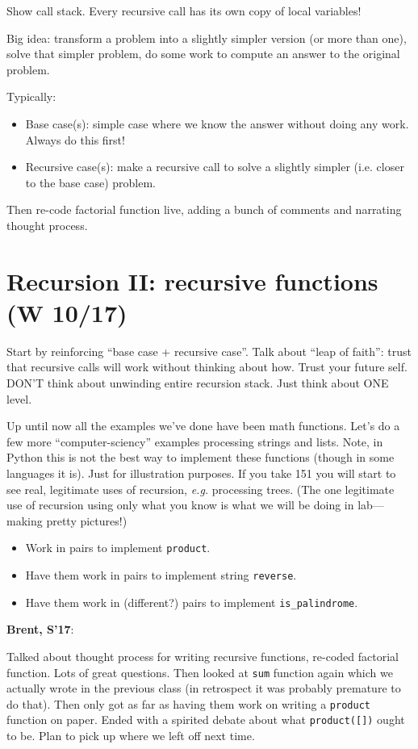 \documentclass{article}
\newcommand{\eg}{\emph{e.g.}\xspace}
\newenvironment{reflect}[1]
{
  \noindent
  \begin{lrbox}{\reflectbox}
    \begin{minipage}[t]{\textwidth}
      \textbf{#1}:
}{
    \end{minipage}
  \end{lrbox}
  \fbox{\usebox{\reflectbox}}
}
\begin{document}
Show call stack.  Every recursive call has its own copy of local
variables!

Big idea: transform a problem into a slightly simpler version (or more
than one), solve that simpler problem, do some work to compute an
answer to the original problem.

Typically:
\begin{itemize}
\item Base case(s): simple case where we know the answer without doing
  any work.  Always do this first!
\item Recursive case(s): make a recursive call to solve a slightly
  simpler (i.e. closer to the base case) problem.
\end{itemize}

Then re-code factorial function live, adding a bunch of comments and
  narrating thought process.

\newpage
\section{Recursion II: recursive functions (W 10/17)}

Start by reinforcing ``base case + recursive case''.  Talk about
``leap of faith'': trust that recursive calls will work without
thinking about how.  Trust your future self.  DON'T think about
unwinding entire recursion stack.  Just think about ONE level.

Up until now all the examples we've done have been math functions.
Let's do a few more ``computer-sciency'' examples processing strings
and lists.  Note, in Python this is not the best way to implement
these functions (though in some languages it is).  Just for
illustration purposes.  If you take 151 you will start to see real,
legitimate uses of recursion, \eg processing trees.  (The one
legitimate use of recursion using only what you know is what we will
be doing in lab---making pretty pictures!)

\begin{itemize}
\item Work in pairs to implement \verb|product|.
\item Have them work in pairs to implement string \verb|reverse|.
\item Have them work in (different?) pairs to implement \verb|is_palindrome|.
\end{itemize}

\begin{reflect}{Brent, S'17}
  Talked about thought process for writing recursive functions,
  re-coded factorial function.  Lots of great questions.  Then looked
  at \texttt{sum} function again which we actually wrote in the
  previous class (in retrospect it was probably premature to do
  that).  Then only got as far as having them work on writing a
  \texttt{product} function on paper.  Ended with a spirited debate
  about what \texttt{product([])} ought to be.  Plan to pick up where
  we left off next time.
\end{reflect}
\end{document}

